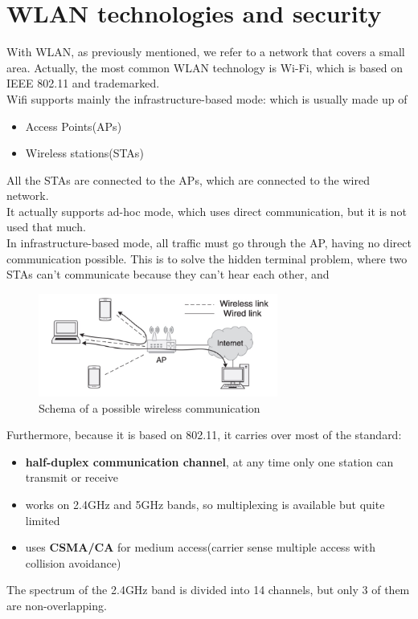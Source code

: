 \chapter{WLAN technologies and security}
With WLAN, as previously mentioned, we refer to a network that covers a small area. Actually, the most
common WLAN technology is Wi-Fi, which is based on IEEE 802.11 and trademarked.\\
Wifi supports mainly the infrastructure-based mode: which is usually made up of 
\begin{itemize}
  \item Access Points(APs)
  \item Wireless stations(STAs)
\end{itemize}
All the STAs are connected to the APs, which are connected to the wired network.\\
It actually supports ad-hoc mode, which uses direct communication, but it is not used that much.\\
  In infrastructure-based mode, all traffic must go through the AP, having no direct communication 
  possible. This is to solve the hidden terminal problem, where two STAs can't communicate because they
  can't hear each other, and 
\begin{figure}[h]
  \centering
  \includegraphics[width=0.7\textwidth]{img/wireless/wlan communication.png}
  \caption{Schema of a possible wireless communication}
\end{figure}
Furthermore, because it is based on 802.11, it carries over most of the standard:
\begin{itemize}
  \item \textbf{half-duplex communication channel}, at any time only one station can transmit or receive
  \item works on 2.4GHz and 5GHz bands, so multiplexing is available but quite limited
  \item uses \textbf{CSMA/CA} for medium access(carrier sense multiple access with collision avoidance)
\end{itemize}
The spectrum of the 2.4GHz band is divided into 14 channels, but only 3 of them are non-overlapping.
